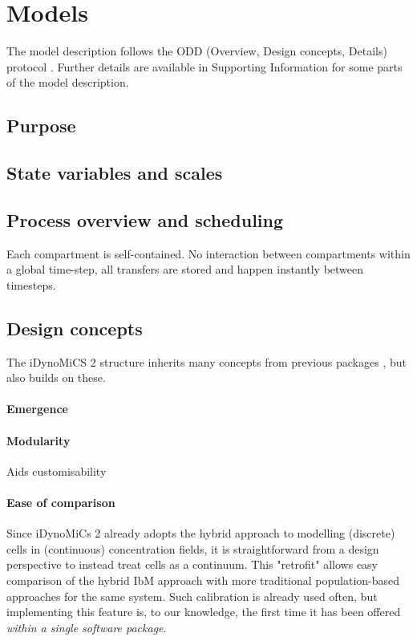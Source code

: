 \documentclass[10pt,letterpaper]{article}
\begin{document}
\section*{Models}
The model description follows the ODD (Overview, Design concepts, Details) protocol \cite{Grimm2006, Grimm2010}. Further details are available in Supporting Information for some parts of the model description.

\subsection*{Purpose}


\subsection*{State variables and scales}


\subsection*{Process overview and scheduling}
Each compartment is self-contained.
No interaction between compartments within a global time-step, all transfers are stored and happen instantly between timesteps.

\subsection*{Design concepts}
The iDynoMiCS 2 structure inherits many concepts from previous packages \cite{Kreft1998, Lardon2011}, but also builds on these.
\paragraph{Emergence}


\paragraph{Modularity}
Aids customisability

\paragraph{Ease of comparison}
Since iDynoMiCs 2 already adopts the hybrid approach to modelling (discrete) cells in (continuous) concentration fields, it is straightforward from a design perspective to instead treat cells as a continuum. This "retrofit" allows easy comparison of the hybrid IbM approach with more traditional population-based approaches \cite{wanner1986}
for the same system. Such calibration is already used often,
but implementing this feature is, to our knowledge, the first time it has been offered \textit{within a single software package}.
\end{document}
